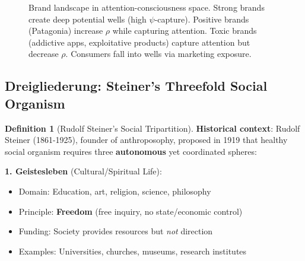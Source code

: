 \documentclass[11pt,a4paper]{article}
\theoremstyle{definition}
\newtheorem{definition}{Definition}[section]
\theoremstyle{remark}
\begin{document}
\begin{enumerate}
\begin{figure}[H]
\caption{Brand landscape in attention-consciousness space. Strong brands create deep potential wells (high \(\psi\)-capture). Positive brands (Patagonia) increase \(\rho\) while capturing attention. Toxic brands (addictive apps, exploitative products) capture attention but decrease \(\rho\). Consumers fall into wells via marketing exposure.}
\label{fig:brand_attractors}
\end{figure}

\subsection{Dreigliederung: Steiner's Threefold Social Organism}

\begin{definition}[Rudolf Steiner's Social Tripartition]
\textbf{Historical context}: Rudolf Steiner (1861-1925), founder of anthroposophy, proposed in 1919 that healthy social organism requires three \textbf{autonomous} yet coordinated spheres:

\textbf{1. Geistesleben} (Cultural/Spiritual Life):
\begin{itemize}
    \item Domain: Education, art, religion, science, philosophy
    \item Principle: \textbf{Freedom} (free inquiry, no state/economic control)
    \item Funding: Society provides resources but \textit{not} direction
    \item Examples: Universities, churches, museums, research institutes
\end{itemize}


\end{definition}
\end{enumerate}
\end{document}
